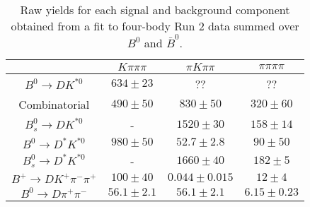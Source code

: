 \begin{table}
  \centering
  \begin{tabular}{cccc}
      \toprule
       & $K\pi\pi\pi$ & $\pi K\pi\pi$ & $\pi\pi\pi\pi$ \\
      \midrule
      $B^0 \to DK^{*0}$ & $634 \pm 23$ & ?? & ?? \\
      Combinatorial & $490 \pm 50$ & $830 \pm 50$ & $320 \pm 60$ \\
      $B^0_s \to DK^{*0}$ & \-- & $1520 \pm 30$ & $158 \pm 14$ \\
      $B^0 \to D^*K^{*0}$ & $980 \pm 50$ & $52.7 \pm 2.8$ & $90 \pm 50$ \\
      $B^0_s \to D^*K^{*0}$ & \-- & $1660 \pm 40$ & $182 \pm 5$ \\
      $B^+ \to DK^+\pi^-\pi^+$ & $100 \pm 40$ & $0.044 \pm 0.015$ & $12 \pm 4$ \\
      $B^0 \to D\pi^+\pi^-$ & $56.1 \pm 2.1$ & $56.1 \pm 2.1$ & $6.15 \pm 0.23$ \\
      \bottomrule
      \end{tabular}
  \caption{Raw yields for each signal and background component obtained from a fit to four-body Run 2 data summed over $B^0$ and $\bar{B}^0$.}
\label{tab:yields_combined_4body_run2}
\end{table}

